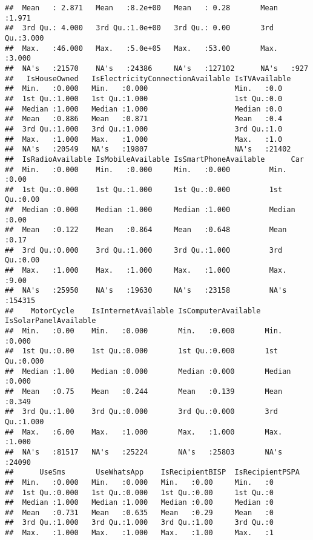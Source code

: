 \documentclass[
]{article}
\begin{document}
\begin{verbatim}
##  Mean   : 2.871   Mean   :8.2e+00   Mean   : 0.28       Mean   :1.971  
##  3rd Qu.: 4.000   3rd Qu.:1.0e+00   3rd Qu.: 0.00       3rd Qu.:3.000  
##  Max.   :46.000   Max.   :5.0e+05   Max.   :53.00       Max.   :3.000  
##  NA's   :21570    NA's   :24386     NA's   :127102      NA's   :927    
##   IsHouseOwned   IsElectricityConnectionAvailable IsTVAvailable  
##  Min.   :0.000   Min.   :0.000                    Min.   :0.0    
##  1st Qu.:1.000   1st Qu.:1.000                    1st Qu.:0.0    
##  Median :1.000   Median :1.000                    Median :0.0    
##  Mean   :0.886   Mean   :0.871                    Mean   :0.4    
##  3rd Qu.:1.000   3rd Qu.:1.000                    3rd Qu.:1.0    
##  Max.   :1.000   Max.   :1.000                    Max.   :1.0    
##  NA's   :20549   NA's   :19807                    NA's   :21402  
##  IsRadioAvailable IsMobileAvailable IsSmartPhoneAvailable      Car        
##  Min.   :0.000    Min.   :0.000     Min.   :0.000         Min.   :0.00    
##  1st Qu.:0.000    1st Qu.:1.000     1st Qu.:0.000         1st Qu.:0.00    
##  Median :0.000    Median :1.000     Median :1.000         Median :0.00    
##  Mean   :0.122    Mean   :0.864     Mean   :0.648         Mean   :0.17    
##  3rd Qu.:0.000    3rd Qu.:1.000     3rd Qu.:1.000         3rd Qu.:0.00    
##  Max.   :1.000    Max.   :1.000     Max.   :1.000         Max.   :9.00    
##  NA's   :25950    NA's   :19630     NA's   :23158         NA's   :154315  
##    MotorCycle    IsInternetAvailable IsComputerAvailable IsSolarPanelAvailable
##  Min.   :0.00    Min.   :0.000       Min.   :0.000       Min.   :0.000        
##  1st Qu.:0.00    1st Qu.:0.000       1st Qu.:0.000       1st Qu.:0.000        
##  Median :1.00    Median :0.000       Median :0.000       Median :0.000        
##  Mean   :0.75    Mean   :0.244       Mean   :0.139       Mean   :0.349        
##  3rd Qu.:1.00    3rd Qu.:0.000       3rd Qu.:0.000       3rd Qu.:1.000        
##  Max.   :6.00    Max.   :1.000       Max.   :1.000       Max.   :1.000        
##  NA's   :81517   NA's   :25224       NA's   :25803       NA's   :24090        
##      UseSms       UseWhatsApp    IsRecipientBISP  IsRecipientPSPA 
##  Min.   :0.000   Min.   :0.000   Min.   :0.00     Min.   :0       
##  1st Qu.:0.000   1st Qu.:0.000   1st Qu.:0.00     1st Qu.:0       
##  Median :1.000   Median :1.000   Median :0.00     Median :0       
##  Mean   :0.731   Mean   :0.635   Mean   :0.29     Mean   :0       
##  3rd Qu.:1.000   3rd Qu.:1.000   3rd Qu.:1.00     3rd Qu.:0       
##  Max.   :1.000   Max.   :1.000   Max.   :1.00     Max.   :1       

\end{verbatim}
\end{document}

